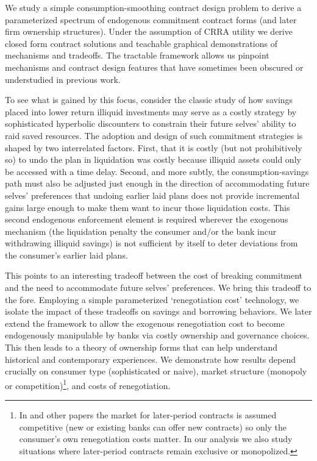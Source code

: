 \documentclass[11pt,english]{article}
\theoremstyle{plain}
\theoremstyle{definition}
\begin{document}
 

We study a simple consumption-smoothing contract design problem to derive
a parameterized spectrum of endogenous commitment contract forms (and
later firm ownership structures). Under the assumption of CRRA utility we derive closed form contract solutions
and teachable graphical demonstrations of mechanisms and tradeoffs. The tractable framework
allows us pinpoint mechanisms and contract design features
that have sometimes been obscured or understudied in previous work.  

To see what is gained by this  focus, consider the classic \citet{laibson1997}
study of how savings placed into lower return illiquid investments
may serve as a costly strategy by sophisticated hyperbolic discounters
to constrain their future selves' ability to raid saved resources.
The adoption and design of such commitment strategies is shaped by two interrelated
factors. First, that it is costly (but not prohibitively so) to undo
the plan \textendash{} in \citet{laibson1997} liquidation was costly
because illiquid assets could only be accessed with a time delay.  Second,
and more subtly, the consumption-savings path must also be adjusted
just enough in the direction of accommodating future
selves' preferences that undoing earlier laid plans does not provide incremental gains large enough to make them want to incur those liquidation
costs. This second endogenous enforcement element is required wherever the exogenous mechanism (the liquidation penalty the consumer and/or the bank incur withdrawing illiquid savings)
is not sufficient by itself to deter deviations
from the consumer's earlier laid plans.
 

This points to an interesting tradeoff between the cost
of breaking commitment and the need to accommodate future selves'
preferences. We bring this tradeoff to the fore. Employing a simple parameterized `renegotiation
cost' technology, we isolate the impact of
these tradeoffs on savings and borrowing behaviors. We later extend the framework to allow the exogenous renegotiation cost to become endogenously manipulable by banks via costly ownership and governance choices. This then leads to a  theory of ownership forms that can help understand historical and contemporary experiences. We demonstrate how results depend crucially on consumer type (sophisticated or naive), market structure (monopoly or competition)\footnote
{In \citet{laibson1997} and other papers the market for later-period
contracts is assumed competitive (new or existing banks can offer
new contracts) so only the consumer's own renegotiation costs matter.
In our analysis we also study situations where later-period contracts
remain exclusive or monopolized. }, and costs of renegotiation.
\end{document}
